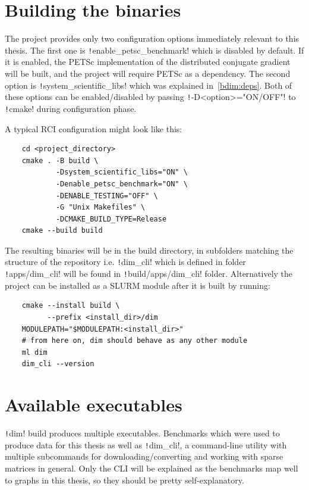 \documentclass[thesis=M,english]{FITthesis}[2019/12/23]
\newcommand{\csre}[1]{\texttt!#1!}
\begin{document}
\section{Building the binaries}

The project provides only two configuration options immediately relevant to this thesis. The
first one is \csre{enable_petsc_benchmark} which is disabled by default. If it is enabled,
the PETSc implementation of the distributed conjugate gradient will be built, and the project
will require PETSc as a dependency. The second option is \csre{system_scientific_libs} which
was explained in~\ref{bdim:deps}. Both of these options can be enabled/disabled by passing
\csre{-D<option>="ON/OFF"} to \csre{cmake} during configuration phase.

A typical RCI configuration might look like this:
\begin{verbatim}
    cd <project_directory>
    cmake . -B build \
            -Dsystem_scientific_libs="ON" \
            -Denable_petsc_benchmark="ON" \
            -DENABLE_TESTING="OFF" \
            -G "Unix Makefiles" \
            -DCMAKE_BUILD_TYPE=Release
    cmake --build build
\end{verbatim}

The resulting binaries will be in the build directory, in subfolders matching the structure of
the repository i.e. \csre{dim_cli} which is defined in folder \csre{apps/dim_cli} will be found
in \csre{build/apps/dim_cli} folder. Alternatively the project can be installed as a SLURM module
after it is built by running:

\begin{verbatim}
    cmake --install build \
          --prefix <install_dir>/dim
    MODULEPATH="$MODULEPATH:<install_dir>"
    # from here on, dim should behave as any other module
    ml dim
    dim_cli --version
\end{verbatim}

\section{Available executables}

\csre{dim} build produces multiple executables. Benchmarks which were used to produce data for this thesis as
well as \csre{dim_cli}, a command-line utility with multiple subcommands for downloading/converting and
working with sparse matrices in general. Only the CLI will be explained as the benchmarks map well to
graphs in this thesis, so they should be pretty self-explanatory.
\end{document}
